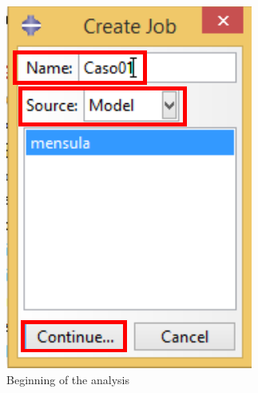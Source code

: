 \begin{enumerate}
\begin{figure}[H]
\begin{subfigure}{0.33\textwidth}
      \includegraphics[width=\textwidth]{./body/images/imagen62.pdf}
      \caption{Beginning of the analysis}
      \label{figu62}
    \end{subfigure}%
    ~ %
    \begin{subfigure}{0.49\textwidth}

\end{subfigure}
\end{figure}
\end{enumerate}
